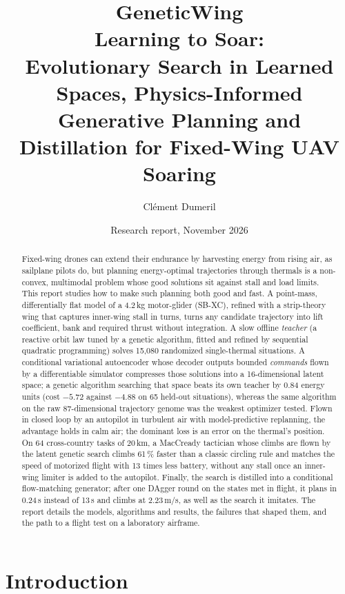 \documentclass[11pt,a4paper,oneside]{report}
\title{\textbf{GeneticWing}\\[0.6em]\Large Learning to Soar:\\ Evolutionary Search in Learned Spaces, Physics-Informed Generative Planning and Distillation for Fixed-Wing UAV Soaring}
\author{Clément Dumeril}
\date{Research report, November 2026}
\begin{document}
\maketitle

\begin{abstract}
Fixed-wing drones can extend their endurance by harvesting energy from rising air, as sailplane pilots do, but planning energy-optimal trajectories through thermals is a non-convex, multimodal problem whose good solutions sit against stall and load limits. This report studies how to make such planning both good and fast. A point-mass, differentially flat model of a 4.2\,kg motor-glider (SB-XC), refined with a strip-theory wing that captures inner-wing stall in turns, turns any candidate trajectory into lift coefficient, bank and required thrust without integration. A slow offline \emph{teacher} (a reactive orbit law tuned by a genetic algorithm, fitted and refined by sequential quadratic programming) solves 15{,}080 randomized single-thermal situations. A conditional variational autoencoder whose decoder outputs bounded \emph{commands} flown by a differentiable simulator compresses those solutions into a 16-dimensional latent space; a genetic algorithm searching that space beats its own teacher by 0.84 energy units (cost $-5.72$ against $-4.88$ on 65 held-out situations), whereas the same algorithm on the raw 87-dimensional trajectory genome was the weakest optimizer tested. Flown in closed loop by an autopilot in turbulent air with model-predictive replanning, the advantage holds in calm air; the dominant loss is an error on the thermal's position. On 64 cross-country tasks of 20\,km, a MacCready tactician whose climbs are flown by the latent genetic search climbs 61\,\% faster than a classic circling rule and matches the speed of motorized flight with 13 times less battery, without any stall once an inner-wing limiter is added to the autopilot. Finally, the search is distilled into a conditional flow-matching generator; after one DAgger round on the states met in flight, it plans in 0.24\,s instead of 13\,s and climbs at 2.23\,m/s, as well as the search it imitates. The report details the models, algorithms and results, the failures that shaped them, and the path to a flight test on a laboratory airframe.
\end{abstract}

\tableofcontents
\listoffigures
\listoftables

\chapter{Introduction}
\end{document}
